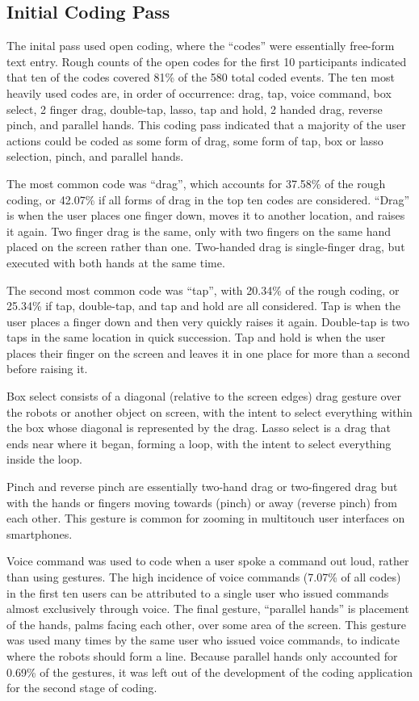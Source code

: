 \subsection{Initial Coding Pass} \label{section:Initial_coding_pass}

The inital pass used open coding, where the ``codes'' were essentially free-form text entry. 
Rough counts of the open codes for the first 10 participants indicated that ten of the codes covered 81\% of the 580 total coded events. 
The ten most heavily used codes are, in order of occurrence: drag, tap, voice command, box select, 2 finger drag, double-tap, lasso, tap and hold, 2 handed drag, reverse pinch, and parallel hands. 
This coding pass indicated that a majority of the user actions could be coded as some form of drag, some form of tap, box or lasso selection, pinch, and parallel hands. 

The most common code was ``drag'', which accounts for 37.58\% of the rough coding, or 42.07\% if all forms of drag in the top ten codes are considered. ``Drag'' is when the user places one finger down, moves it to another location, and raises it again. Two finger drag is the same, only with two fingers on the same hand placed on the screen rather than one. Two-handed drag is single-finger drag, but executed with both hands at the same time. 

The second most common code was ``tap'', with 20.34\% of the rough coding, or 25.34\% if tap, double-tap, and tap and hold are all considered. Tap is when the user places a finger down and then very quickly raises it again. Double-tap is two taps in the same location in quick succession. Tap and hold is when the user places their finger on the screen and leaves it in one place for more than a second before raising it. 

Box select consists of a diagonal (relative to the screen edges) drag gesture over the robots or another object on screen, with the intent to select everything within the box whose diagonal is represented by the drag. 
Lasso select is a drag that ends near where it began, forming a loop, with the intent to select everything inside the loop. 

Pinch and reverse pinch are essentially two-hand drag or two-fingered drag but with the hands or fingers moving towards (pinch) or away (reverse pinch) from each other.
This gesture is common for zooming in multitouch user interfaces on smartphones. 

Voice command was used to code when a user spoke a command out loud, rather than using gestures. The high incidence of voice commands (7.07\% of all codes) in the first ten users can be attributed to a single user who issued commands almost exclusively through voice. 
The final gesture, ``parallel hands'' is placement of the hands, palms facing each other, over some area of the screen. This gesture was used many times by the same user who issued voice commands, to indicate where the robots should form a line. Because parallel hands only accounted for 0.69\% of the gestures, it was left out of the development of the coding application for the second stage of coding. 

